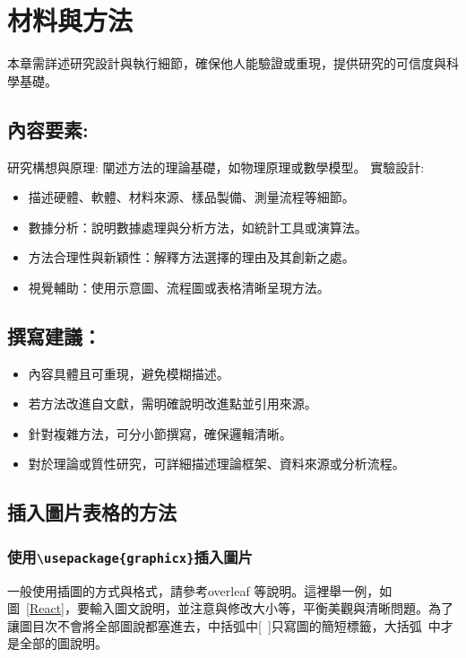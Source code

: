 
\chapter{材料與方法}
本章需詳述研究設計與執行細節，確保他人能驗證或重現，提供研究的可信度與科學基礎。

\section{內容要素:}
研究構想與原理:
闡述方法的理論基礎，如物理原理或數學模型。
實驗設計:
\begin{itemize}
    \item 描述硬體、軟體、材料來源、樣品製備、測量流程等細節。
   \item 數據分析：說明數據處理與分析方法，如統計工具或演算法。
   \item 方法合理性與新穎性：解釋方法選擇的理由及其創新之處。
   \item 視覺輔助：使用示意圖、流程圖或表格清晰呈現方法。

\end{itemize}

\section{撰寫建議：}
\begin{itemize}
    \item 內容具體且可重現，避免模糊描述。
    \item 若方法改進自文獻，需明確說明改進點並引用來源。
    \item 針對複雜方法，可分小節撰寫，確保邏輯清晰。
    \item 對於理論或質性研究，可詳細描述理論框架、資料來源或分析流程。
\end{itemize}


\section{插入圖片表格的方法}
\subsection{使用\texttt{\textbackslash usepackage\{graphicx\}}插入圖片}
一般使用插圖的方式與格式，請參考overleaf 等說明。這裡舉一例，如圖~\ref{React}，要輸入圖文說明，並注意與修改大小等，平衡美觀與清晰問題。為了讓圖目次不會將全部圖說都塞進去，中括弧中[~]只寫圖的簡短標籤，大括弧{~}中才是全部的圖說明。
 
